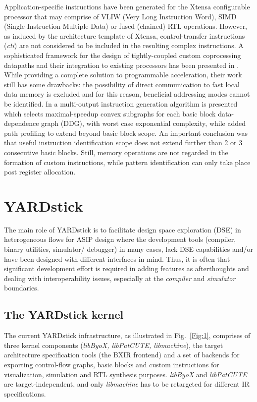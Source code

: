 \documentclass{comjnl}
\begin{document}
Application-specific instructions have been generated for the Xtensa configurable 
processor \cite{Goodwin03} that may comprise of VLIW (Very Long Instruction Word), SIMD 
(Single-Instruction Multiple-Data) or fused (chained) RTL operations. However, as induced by the architecture template of Xtensa, control-transfer instructions ({\it cti}) are not considered to be included in the resulting complex instructions. A sophisticated framework for the design of tightly-coupled custom coprocessing datapaths and their integration to existing processors has been presented in \cite{ClarkN05}. While providing a complete solution to programmable acceleration, their work still has some drawbacks: the possibility 
of direct communication to fast local data memory is excluded and for this reason, 
beneficial addressing modes cannot be identified. In \cite{Atasu03,Pozzi06} a multi-output 
instruction generation algorithm is presented which selects maximal-speedup convex 
subgraphs for each basic block data-dependence graph (DDG), with worst case exponential 
complexity, while \cite{Yu04a} added path profiling to extend beyond basic block scope.
An important conclusion was that useful instruction identification scope does not extend 
further than 2 or 3 consecutive basic blocks. Still, memory operations are not regarded 
in the formation of custom instructions, while pattern identification can only take 
place post register allocation.

\section{YARDstick}
\label{Sec:YARDstick}
The main role of YARDstick is to facilitate design space exploration (DSE) in heterogeneous flows for ASIP design where the development tools (compiler, binary utilities, simulator/ debugger) in many cases, lack DSE capabilities and/or have been designed with different interfaces in mind. Thus, it is often that significant development effort is required in adding features as afterthoughts and dealing with interoperability issues, especially at the {\it compiler} and {\it simulator} boundaries.

\subsection{The YARDstick kernel}
\label{Sec:YARDstickKernel}
The current YARDstick infrastructure, as illustrated in Fig.~\ref{Fig:1}, comprises of three kernel components ({\it libByoX, libPatCUTE, libmachine}), the target architecture specification tools (the BXIR frontend) and a set of backends for exporting control-flow graphs, basic blocks and custom instructions for visualization, simulation and RTL synthesis purposes. {\it libByoX} and {\it libPatCUTE} are target-independent, and only {\it libmachine} has to be retargeted for different IR specifications.
\end{document}
